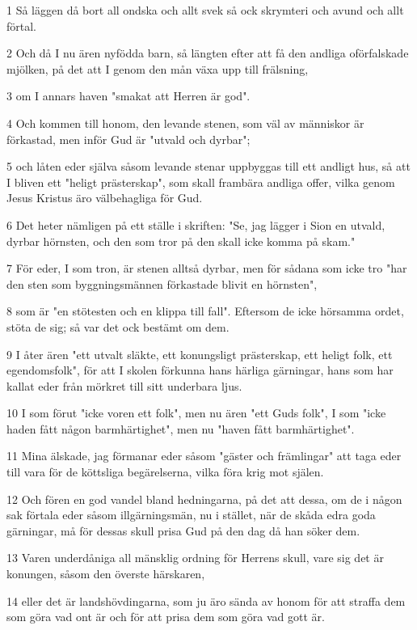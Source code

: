 \par 1 Så läggen då bort all ondska och allt svek så ock skrymteri och avund och allt förtal.
\par 2 Och då I nu ären nyfödda barn, så längten efter att få den andliga oförfalskade mjölken, på det att I genom den mån växa upp till frälsning,
\par 3 om I annars haven "smakat att Herren är god".
\par 4 Och kommen till honom, den levande stenen, som väl av människor är förkastad, men inför Gud är "utvald och dyrbar";
\par 5 och låten eder själva såsom levande stenar uppbyggas till ett andligt hus, så att I bliven ett "heligt prästerskap", som skall frambära andliga offer, vilka genom Jesus Kristus äro välbehagliga för Gud.
\par 6 Det heter nämligen på ett ställe i skriften: "Se, jag lägger i Sion en utvald, dyrbar hörnsten, och den som tror på den skall icke komma på skam."
\par 7 För eder, I som tron, är stenen alltså dyrbar, men för sådana som icke tro "har den sten som byggningsmännen förkastade blivit en hörnsten",
\par 8 som är "en stötesten och en klippa till fall". Eftersom de icke hörsamma ordet, stöta de sig; så var det ock bestämt om dem.
\par 9 I åter ären "ett utvalt släkte, ett konungsligt prästerskap, ett heligt folk, ett egendomsfolk", för att I skolen förkunna hans härliga gärningar, hans som har kallat eder från mörkret till sitt underbara ljus.
\par 10 I som förut "icke voren ett folk", men nu ären "ett Guds folk", I som "icke haden fått någon barmhärtighet", men nu "haven fått barmhärtighet".
\par 11 Mina älskade, jag förmanar eder såsom "gäster och främlingar" att taga eder till vara för de köttsliga begärelserna, vilka föra krig mot själen.
\par 12 Och fören en god vandel bland hedningarna, på det att dessa, om de i någon sak förtala eder såsom illgärningsmän, nu i stället, när de skåda edra goda gärningar, må för dessas skull prisa Gud på den dag då han söker dem.
\par 13 Varen underdåniga all mänsklig ordning för Herrens skull, vare sig det är konungen, såsom den överste härskaren,
\par 14 eller det är landshövdingarna, som ju äro sända av honom för att straffa dem som göra vad ont är och för att prisa dem som göra vad gott är.
